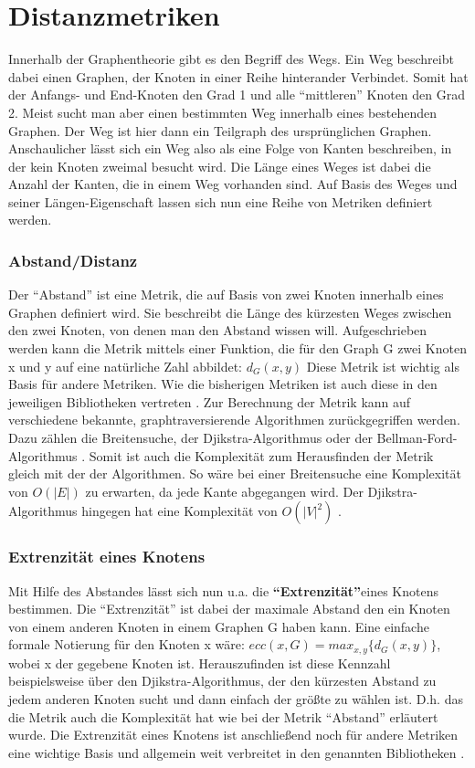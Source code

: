 \documentclass[a4paper,12pt,ngerman,chapterprefix=false,listof=totoc,bibliography=totoc]{scrreprt}
\begin{document}
\section{Distanzmetriken}
{
Innerhalb der Graphentheorie gibt es den Begriff des Wegs. Ein Weg beschreibt dabei einen Graphen, der Knoten in einer Reihe hinterander Verbindet. Somit hat der Anfangs- und End-Knoten den Grad 1 und alle "`mittleren"' Knoten den Grad 2. Meist sucht man aber einen bestimmten Weg innerhalb eines bestehenden Graphen. Der Weg ist hier dann ein Teilgraph des ursprünglichen Graphen. Anschaulicher lässt sich ein Weg also als eine Folge von Kanten beschreiben, in der kein Knoten zweimal besucht wird. Die Länge eines Weges ist dabei die Anzahl der Kanten, die in einem Weg vorhanden sind. \cite{diestel_graphentheorie_2000} Auf Basis des Weges und seiner Längen-Eigenschaft lassen sich nun eine Reihe von Metriken definiert werden.
\subsubsection*{Abstand/Distanz}
{
Der "`Abstand"' ist eine Metrik, die auf Basis von zwei Knoten innerhalb eines Graphen definiert wird. Sie beschreibt die Länge des kürzesten Weges zwischen den zwei Knoten, von denen man den Abstand wissen will. Aufgeschrieben werden kann die Metrik mittels einer Funktion, die für den Graph G zwei Knoten x und y auf eine natürliche Zahl abbildet: \(d_G (x,y)\) \cite{diestel_graphentheorie_2000} Diese Metrik ist wichtig als Basis für andere Metriken. Wie die bisherigen Metriken ist auch diese in den jeweiligen Bibliotheken vertreten \cite{sagemath_graph_2020,matlab_shortest_2020,wolfram_graph_2020}. Zur Berechnung der Metrik kann auf verschiedene bekannte, graphtraversierende Algorithmen zurückgegriffen werden. Dazu zählen die Breitensuche, der Djikstra-Algorithmus oder der Bellman-Ford-Algorithmus \cite{sagemath_graph_2020}. Somit ist auch die Komplexität zum Herausfinden der Metrik gleich mit der der Algorithmen. So wäre bei einer Breitensuche eine Komplexität von \(O(\vert E\vert)\) zu erwarten, da jede Kante abgegangen wird. Der Djikstra-Algorithmus hingegen hat eine Komplexität von \(O(\vert V\vert ^2)\) \cite{jungnickel_graphs_2013}.
}
\subsubsection*{Extrenzität eines Knotens}
{
Mit Hilfe des Abstandes lässt sich nun u.a. die \textbf{"`Extrenzität"'}eines Knotens bestimmen. Die "`Extrenzität"' ist dabei der maximale Abstand den ein Knoten von einem anderen Knoten in einem Graphen G haben kann. Eine einfache formale Notierung für den Knoten x wäre: \(ecc(x, G)=max_{x,y}\{d_G(x,y)\}\), wobei x der gegebene Knoten ist. \cite{harary_graph_2001} Herauszufinden ist diese Kennzahl beispielsweise über den Djikstra-Algorithmus, der den kürzesten Abstand zu jedem anderen Knoten sucht und dann einfach der größte zu wählen ist. D.h. das die Metrik auch die Komplexität hat wie bei der Metrik "`Abstand"' erläutert wurde. Die Extrenzität eines Knotens ist anschließend noch für andere Metriken eine wichtige Basis und allgemein weit verbreitet in den genannten Bibliotheken \cite{sagemath_graph_2020,matlab_shortest_2020,wolfram_graph_2020}.
}
}
\end{document}
